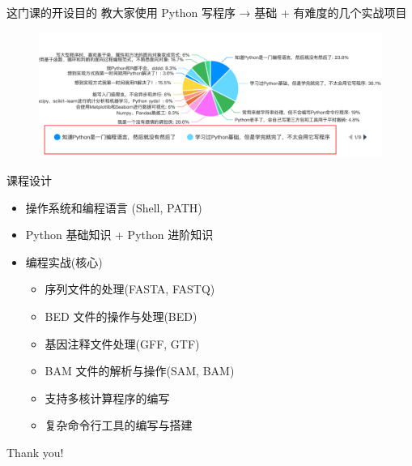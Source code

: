 \begin{frame}{这门课的开设目的}
    教大家使用 Python 写程序 → 基础 + 有难度的几个实战项目
    \begin{figure}
        \centering
        \includegraphics[width=15cm]{Images/level3.png}
    \end{figure}
\end{frame}



\begin{frame}{课程设计}
    \begin{itemize}
        \item 操作系统和编程语言 (Shell, PATH)
        \item Python 基础知识 + Python 进阶知识
        \item 编程实战(核心)
        \begin{itemize}
            \item 序列文件的处理(FASTA, FASTQ)
            \item BED 文件的操作与处理(BED)
            \item 基因注释文件处理(GFF, GTF)
            \item BAM 文件的解析与操作(SAM, BAM)
            \item 支持多核计算程序的编写
            \item 复杂命令行工具的编写与搭建
        \end{itemize}
    \end{itemize}
\end{frame}


\begin{frame}[standout] Thank you! \end{frame}


